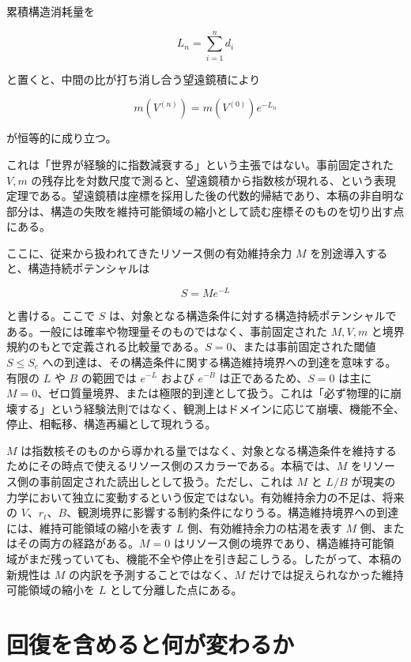 \documentclass[12pt,a4paper]{article}
\begin{document}
累積構造消耗量を

\[
L_{n}=\sum_{i=1}^{n} d_{i}
\]

と置くと、中間の比が打ち消し合う望遠鏡積により

\[
m(V^{(n)})=m(V^{(0)})e^{-L_{n}}
\]

が恒等的に成り立つ。

これは「世界が経験的に指数減衰する」という主張ではない。事前固定された \(V,m\) の残存比を対数尺度で測ると、望遠鏡積から指数核が現れる、という表現定理である。望遠鏡積は座標を採用した後の代数的帰結であり、本稿の非自明な部分は、構造の失敗を維持可能領域の縮小として読む座標そのものを切り出す点にある。

ここに、従来から扱われてきたリソース側の有効維持余力 \(M\) を別途導入すると、構造持続ポテンシャルは

\[
S=Me^{-L}
\]

と書ける。ここで \(S\) は、対象となる構造条件に対する構造持続ポテンシャルである。一般には確率や物理量そのものではなく、事前固定された \(M,V,m\) と境界規約のもとで定義される比較量である。\(S=0\)、または事前固定された閾値 \(S\le S_{c}\) への到達は、その構造条件に関する構造維持境界への到達を意味する。有限の \(L\) や \(B\) の範囲では \(e^{-L}\) および \(e^{-B}\) は正であるため、\(S=0\) は主に \(M=0\)、ゼロ質量境界、または極限的到達として扱う。これは「必ず物理的に崩壊する」という経験法則ではなく、観測上はドメインに応じて崩壊、機能不全、停止、相転移、構造再編として現れうる。

\(M\) は指数核そのものから導かれる量ではなく、対象となる構造条件を維持するためにその時点で使えるリソース側のスカラーである。本稿では、\(M\) をリソース側の事前固定された読出しとして扱う。ただし、これは \(M\) と \(L/B\) が現実の力学において独立に変動するという仮定ではない。有効維持余力の不足は、将来の \(V\)、\(r_{t}\)、\(B\)、観測境界に影響する制約条件になりうる。構造維持境界への到達には、維持可能領域の縮小を表す \(L\) 側、有効維持余力の枯渇を表す \(M\) 側、またはその両方の経路がある。\(M=0\) はリソース側の境界であり、構造維持可能領域がまだ残っていても、機能不全や停止を引き起こしうる。したがって、本稿の新規性は \(M\) の内訳を予測することではなく、\(M\) だけでは捉えられなかった維持可能領域の縮小を \(L\) として分離した点にある。

\section{回復を含めると何が変わるか}\label{ux56deux5fa9ux3092ux542bux3081ux308bux3068ux4f55ux304cux5909ux308fux308bux304b}
\end{document}
